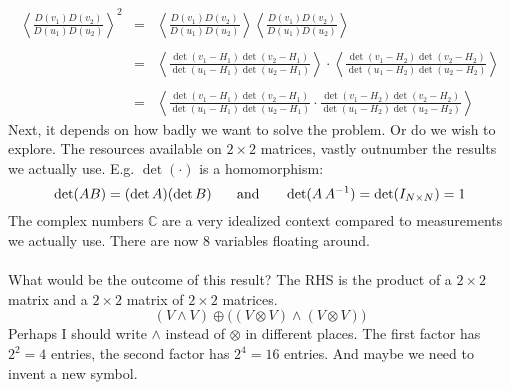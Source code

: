 \documentclass[12pt]{article}
\begin{document}
\begin{eqnarray*}
\left\langle 
\frac{D(v_1)D(v_2)}{D(u_1) D(u_2)}
\right\rangle^2
 &=&
\left\langle 
\frac{D(v_1)D(v_2)}{D(u_1) D(u_2)}
\right\rangle 
\left\langle 
\frac{D(v_1)D(v_2)}{D(u_1) D(u_2)}
\right\rangle \\ \\
&=& \left\langle \frac{\det (v_1 - H_1)\det (v_2 - H_1)}{
\det (u_1 - H_1)\det (u_2 - H_1)} \right\rangle \cdot
\left\langle \frac{\det (v_1 - H_2)\det (v_2 - H_2)}{
\det (u_1 - H_2)\det (u_2 - H_2)} \right\rangle \\ \\
&=& 
\left\langle \frac{\det (v_1 - H_1)\det (v_2 - H_1)}{
\det (u_1 - H_1)\det (u_2 - H_1)} \cdot \frac{\det (v_1 - H_2)\det (v_2 - H_2)}{
\det (u_1 - H_2)\det (u_2 - H_2)} \right\rangle 
 \end{eqnarray*} 
Next, it depends on how badly we want to solve the problem.  Or do we wish to explore.  The resources available on $2 \times 2$ matrices, vastly outnumber the results we actually use.  E.g. $\det(\cdot)$ is a homomorphism:
$$ \det(AB) = (\det A )(\det B) \hspace{0.25in}\text{and}\hspace{0.25in} \det(A\, A^{-1}) = \det(I_{N \times N}) = 1$$
The complex numbers $\mathbb{C}$ are a very idealized context compared to measurements we actually use.  There are now 8 variables floating around. \\ \\
What would be the outcome of this result?  The RHS is the product of a $2 \times 2$ matrix and a $2\times 2 $ matrix of $2 \times 2$ matrices.  
$$ (V \wedge V) \oplus \Big((V \otimes V) \wedge (V \otimes V)\Big) $$
Perhaps I should write $\wedge$ instead of $\otimes$ in different places.  The first factor has $2^2 = 4$ entries, the second factor has $2^4 = 16$ entries.   And maybe we need to invent a new symbol. 

\newpage
\end{document}
